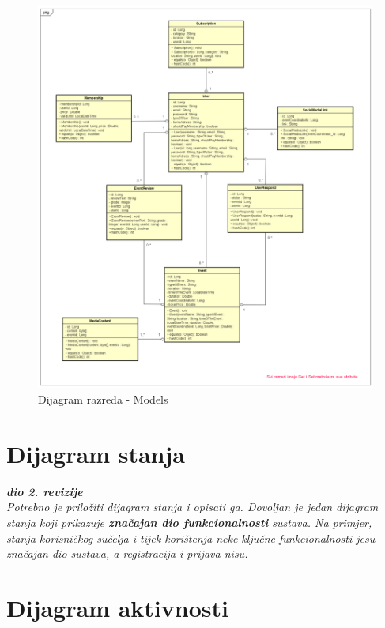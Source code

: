 			\begin{figure}[H]
				\includegraphics[width=\textwidth]{dijagrami/cd1.png} 
				\centering
				\caption{Dijagram razreda - Models}
				\label{cd1}
			\end{figure}

			\eject
		
		\section{Dijagram stanja}
			
			
			\textbf{\textit{dio 2. revizije}}\\
			
			\textit{Potrebno je priložiti dijagram stanja i opisati ga. Dovoljan je jedan dijagram stanja koji prikazuje \textbf{značajan dio funkcionalnosti} sustava. Na primjer, stanja korisničkog sučelja i tijek korištenja neke ključne funkcionalnosti jesu značajan dio sustava, a registracija i prijava nisu. }
			
			
			\eject 
		
		\section{Dijagram aktivnosti}
			
